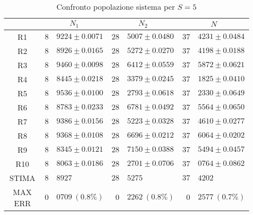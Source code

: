 \begin{table}[!h]
\begin{tabular}{c|r@{.}l|r@{.}l|r@{.}l}
& \multicolumn{2}{|c|}{$N_1$}
& \multicolumn{2}{|c|}{$N_2$}
& \multicolumn{2}{|c}{$N$} 
\\          
\hline
R1      & $8$&$9224 \pm 0.0071$ & $28$&$5007 \pm 0.0480$ & $37$&$4231 \pm 0.0484$ \\
R2      & $8$&$8926 \pm 0.0165$ & $28$&$5272 \pm 0.0270$ & $37$&$4198 \pm 0.0188$ \\
R3      & $8$&$9460 \pm 0.0098$ & $28$&$6412 \pm 0.0559$ & $37$&$5872 \pm 0.0621$ \\
R4      & $8$&$8445 \pm 0.0218$ & $28$&$3379 \pm 0.0245$ & $37$&$1825 \pm 0.0410$ \\
R5      & $8$&$9536 \pm 0.0100$ & $28$&$2793 \pm 0.0618$ & $37$&$2330 \pm 0.0649$ \\
R6      & $8$&$8783 \pm 0.0233$ & $28$&$6781 \pm 0.0492$ & $37$&$5564 \pm 0.0650$ \\
R7      & $8$&$9386 \pm 0.0156$ & $28$&$5223 \pm 0.0328$ & $37$&$4610 \pm 0.0277$ \\
R8      & $8$&$9368 \pm 0.0108$ & $28$&$6696 \pm 0.0212$ & $37$&$6064 \pm 0.0202$ \\
R9      & $8$&$8345 \pm 0.0121$ & $28$&$7150 \pm 0.0388$ & $37$&$5494 \pm 0.0457$ \\
R10     & $8$&$8063 \pm 0.0186$ & $28$&$2701 \pm 0.0706$ & $37$&$0764 \pm 0.0862$ \\
STIMA   & $8$&$8927$            & $28$&$5275$            & $37$&$4202$            \\
MAX ERR & $0$&$0709 \ (0.8\%)$  & $0$&$2262 \ (0.8\%)$   & $0$&$2577 \ (0.7\%)$     
\end{tabular}
\centering
\caption{Confronto popolazione sistema per $S=5$}
\label{tab:5_n}
\end{table}
